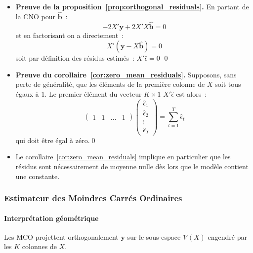 \documentclass[10pt]{beamer}
\begin{document}
\begin{notes}
  \begin{itemize}

  \item \textbf{Preuve de la proposition~\ref{prop:orthogonal_residuals}.} En partant de la CNO pour $\hat{\mathbf b}$~:
  \[
    -2X'\mathbf y + 2 X'X \hat{\mathbf b} = 0
  \]
  et en factorisant on a directement~:
    \[
      X'(\mathbf y - X \hat{\mathbf b}) = 0
    \]
    soit par définition des résidus estimés~:  $X'\hat\epsilon = 0$ \qed\newline

    \item \textbf{Preuve du corollaire~\ref{cor:zero_mean_residuals}.} Supposons, sans perte de généralité, que les éléments de la première colonne de $X$ soit tous égaux à 1. Le premier élément du vecteur $K\times 1$ $X'\hat\epsilon$ est alors~:
    \[
      \begin{pmatrix}
        1 & 1 & \ldots & 1
      \end{pmatrix}
      \begin{pmatrix}
        \hat\epsilon_1\\
        \hat\epsilon_2\\
        \vdots\\
        \hat\epsilon_T
      \end{pmatrix} = \sum_{t=1}^T\hat\epsilon_t
    \]
    qui doit être égal à zéro.\qed\newline

  \item Le corollaire~\ref{cor:zero_mean_residuals} implique en particulier que les
      résidus sont nécessairement de moyenne nulle dès lors que le modèle contient
      une constante.

  \end{itemize}
\end{notes}


\begin{frame}[c]
  \frametitle{Estimateur des Moindres Carrés Ordinaires}
  \framesubtitle{Interprétation géométrique}

  \begin{center}
    \scalebox{.82}{}
  \end{center}

  \medskip

  {\small Les MCO projettent orthogonalement $\mathbf y$ sur le sous-espace
    $\mathcal V(X)$ engendré par les $K$ colonnes de $X$.}

\end{frame}
\end{document}
